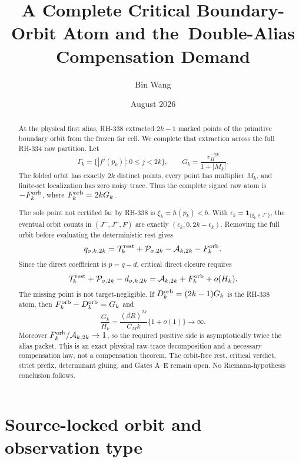 \documentclass[11pt]{article}
\title{A Complete Critical Boundary-Orbit Atom and the\
Double-Alias Compensation Demand}
\author{Bin Wang}
\date{August 2026}
\theoremstyle{remark}
\newcommand{\cP}{\mathcal P}
\newcommand{\cA}{\mathcal A}
\newcommand{\cT}{\mathcal T}
\newcommand{\one}{\mathbf 1}
\begin{document}
\maketitle

\begin{abstract}
At the physical first alias, RH-338 extracted $2k-1$ marked points of the
primitive boundary orbit from the frozen far cell.  We complete that
extraction across the full RH-334 raw partition.  Let
\[
 \Gamma_k=\{|f^j(p_k)|:0\le j<2k\},\qquad
 G_k=\frac{r_H^{-2k}}{1+|M_k|}.
\]
The folded orbit has exactly $2k$ distinct points, every point has multiplier
$M_k$, and finite-set localization has zero noisy trace.  Thus the complete
signed raw atom is $-F_k^{\rm orb}$, where $F_k^{\rm orb}=2kG_k$.

The sole point not certified far by RH-338 is $\xi_k=h(p_k)<b$.  With
$\epsilon_k=\one_{\{\xi_k\in J^-\}}$, the eventual orbit counts in
$(J^-,J^+,F)$ are exactly $(\epsilon_k,0,2k-\epsilon_k)$.  Removing the full
orbit before evaluating the deterministic rest gives
\[
 q_{\sigma,k,2k}=\cT_k^{\rm rest}+\cP_{\sigma,2k}
 -\cA_{k,2k}-F_k^{\rm orb}.
\]
Since the direct coefficient is $p=q-d$, critical direct closure requires
\[
 \cT_k^{\rm rest}+\cP_{\sigma,2k}-d_{\sigma,k,2k}
 =\cA_{k,2k}+F_k^{\rm orb}+o(H_k).
\]
The missing point is not target-negligible.  If
$D_k^{\rm orb}=(2k-1)G_k$ is the RH-338 atom, then
$F_k^{\rm orb}-D_k^{\rm orb}=G_k$ and
\[
 \frac{G_k}{H_k}=\frac{(\beta R)^{2k}}{C_Mk}\{1+o(1)\}\longrightarrow\infty.
\]
Moreover $F_k^{\rm orb}/\cA_{k,2k}\to1$, so the required positive side is
asymptotically twice the alias packet.  This is an exact physical raw-trace
decomposition and a necessary compensation law, not a compensation theorem.
The orbit-free rest, critical verdict, strict prefix, determinant gluing, and
Gates A--E remain open.  No Riemann-hypothesis conclusion follows.
\end{abstract}

\section{Source-locked orbit and observation type}
\end{document}
